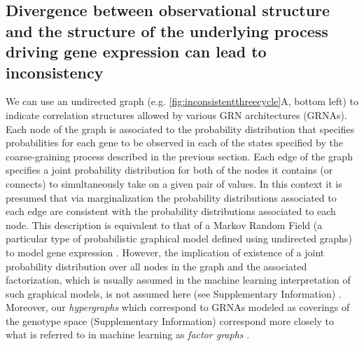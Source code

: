 \subsection{Divergence between observational structure and the structure of the underlying process driving gene expression can lead to inconsistency}
We can use an undirected graph (e.g. \ref{fig:inconsistentthreecycle}A, bottom left) to indicate correlation structures allowed by various GRN architectures (GRNAs). Each node of the graph is associated to the probability distribution that specifies probabilities for each gene to be observed in each of the states specified by the coarse-graining process described in the previous section. Each edge of the graph specifies a joint probability distribution for both of the nodes it contains (or connects) to simultaneously take on a given pair of values. In this context it is presumed that via marginalization the probability distributions associated to each edge are consistent with the probability distributions associated to each node. This description is equivalent to that of a Markov Random Field (a particular type of probabilistic graphical model defined using undirected graphs) to model gene expression \cite{Chen2013a}. However, the implication of existence of a joint probability distribution over all nodes in the graph and the associated factorization, which is usually assumed in the machine learning interpretation of such graphical models, is not assumed here (see Supplementary Information) \cite{Barber2012,Bishop2007,Murphy2012,Koller2009}. Moreover, our \emph{hypergraphs} which correspond to GRNAs modeled as coverings of the genotype space (Supplementary Information) correspond more closely to what is referred to in machine learning as \emph{factor graphs} \cite{Barber2012,Bishop2007,Murphy2012,Koller2009}.

